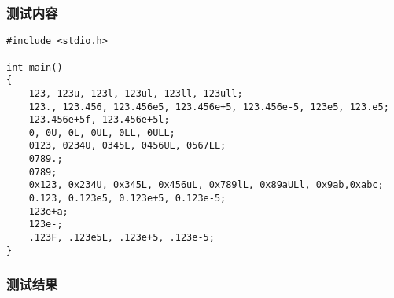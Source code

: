 \documentclass[lang=cn,11pt,a4paper]{paper}
\begin{document}
\subsubsection{测试内容}

\begin{lstlisting}
#include <stdio.h>

int main()
{
    123, 123u, 123l, 123ul, 123ll, 123ull;
    123., 123.456, 123.456e5, 123.456e+5, 123.456e-5, 123e5, 123.e5;
    123.456e+5f, 123.456e+5l;
    0, 0U, 0L, 0UL, 0LL, 0ULL;
    0123, 0234U, 0345L, 0456UL, 0567LL;
    0789.;
    0789;
    0x123, 0x234U, 0x345L, 0x456uL, 0x789lL, 0x89aULl, 0x9ab,0xabc;
    0.123, 0.123e5, 0.123e+5, 0.123e-5;
    123e+a;
    123e-;
    .123F, .123e5L, .123e+5, .123e-5;
}
\end{lstlisting}

\subsubsection{测试结果}
\end{document}
